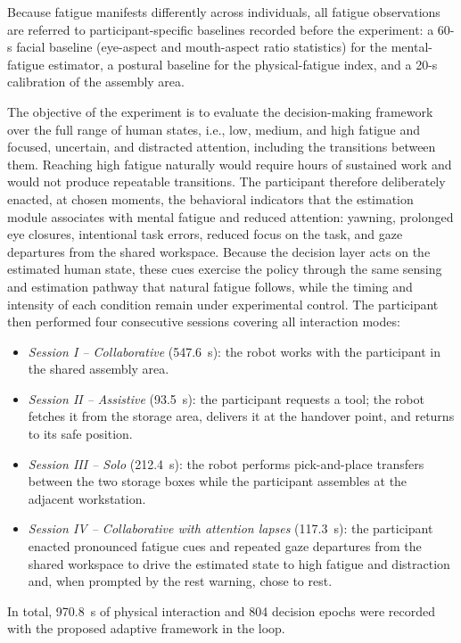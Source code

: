 Because fatigue manifests differently across individuals, all fatigue observations are referred to
participant-specific baselines recorded before the experiment: a 60-s facial baseline (eye-aspect and
mouth-aspect ratio statistics) for the mental-fatigue estimator, a postural baseline for the
physical-fatigue index, and a 20-s calibration of the assembly area.

The objective of the experiment is to evaluate the decision-making framework over the full range of human
states, i.e., low, medium, and high fatigue and focused, uncertain, and distracted attention, including the
transitions between them. Reaching high fatigue naturally would require hours of sustained work and would
not produce repeatable transitions. The participant therefore deliberately enacted, at chosen moments, the
behavioral indicators that the estimation module associates with mental fatigue and reduced attention:
yawning, prolonged eye closures, intentional task errors, reduced focus on the task, and gaze departures
from the shared workspace. Because the decision layer acts on the estimated human state, these cues
exercise the policy through the same sensing and estimation pathway that natural fatigue follows, while
the timing and intensity of each condition remain under experimental control. The participant then
performed four consecutive sessions covering all interaction modes:
\begin{itemize}
\item \textit{Session I -- Collaborative} (547.6~s): the robot works with the participant in the shared
assembly area.
\item \textit{Session II -- Assistive} (93.5~s): the participant requests a tool; the robot fetches it from
the storage area, delivers it at the handover point, and returns to its safe position.
\item \textit{Session III -- Solo} (212.4~s): the robot performs pick-and-place transfers between the two
storage boxes while the participant assembles at the adjacent workstation.
\item \textit{Session IV -- Collaborative with attention lapses} (117.3~s): the participant enacted
pronounced fatigue cues and repeated gaze departures from the shared workspace to drive the estimated state
to high fatigue and distraction and, when prompted by the rest warning, chose to rest.
\end{itemize}
In total, 970.8~s of physical interaction and 804 decision epochs were recorded with the proposed adaptive
framework in the loop.

